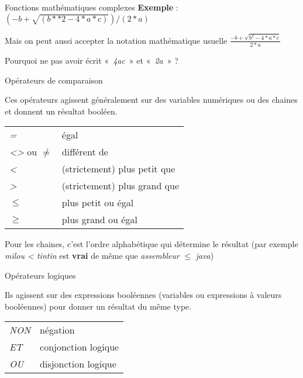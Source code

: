 \begin{frame}{Fonctions mathématiques complexes}
	\textbf{Exemple} : 
	$(-b+\sqrt{(b\ast \ast 2-4\ast a\ast c)})/(2\ast a)$
	
	\bigskip
	
	Mais on peut aussi accepter la notation mathématique usuelle
	$\frac{-b+\sqrt{b^{2}-4\ast a\ast c}}{2\ast a}$ 
	
	\bigskip

	Pourquoi ne pas avoir écrit «~\textit{4ac}~» et
	«~\textit{2a}~» ?
\end{frame}

\begin{frame}{Opérateurs de comparaison}

	Ces opérateurs agissent généralement sur des variables numériques ou des
	chaines et donnent un résultat booléen.

	\begin{tabular}{p{1.6cm}|p{11.5cm}}
	\raggedleft  \textit{=} & égal\\
	\raggedleft  \textit{{\textless}{\textgreater}}
		ou \textit{${\neq}$} &  différent de\\
	\raggedleft  \textit{\textless} & (strictement) plus petit que\\
	\raggedleft  \textit{\textgreater} & (strictement) plus grand que\\
	\raggedleft  \textit{${\leq}$} & plus petit ou égal\\
	\raggedleft  \textit{${\geq}$} & plus grand ou égal\\
	\end{tabular}
	

	Pour les chaines, c'est l’ordre alphabétique qui
	détermine le résultat (par exemple
	\textit{{\textquotedbl}milou{\textquotedbl} {\textless}
	{\textquotedbl}tintin{\textquotedbl}} est \textbf{vrai} de même que
	\textit{{\textquotedbl}assembleur{\textquotedbl}
	}\textit{${\leq}$}\textit{
	{\textquotedbl}java{\textquotedbl}})
	
\end{frame}
	
\begin{frame}{Opérateurs logiques}

	Ils agissent sur des expressions booléennes (variables ou expressions à
	valeurs booléennes) pour donner un résultat du même type.

	\begin{tabular}{p{1.6cm}|p{11.5cm}}
	\raggedleft  \textit{NON} & négation\\
	\raggedleft  \textit{ET} & conjonction logique\\
	\raggedleft  \textit{OU} & disjonction logique\\
	\end{tabular}
\end{frame}

